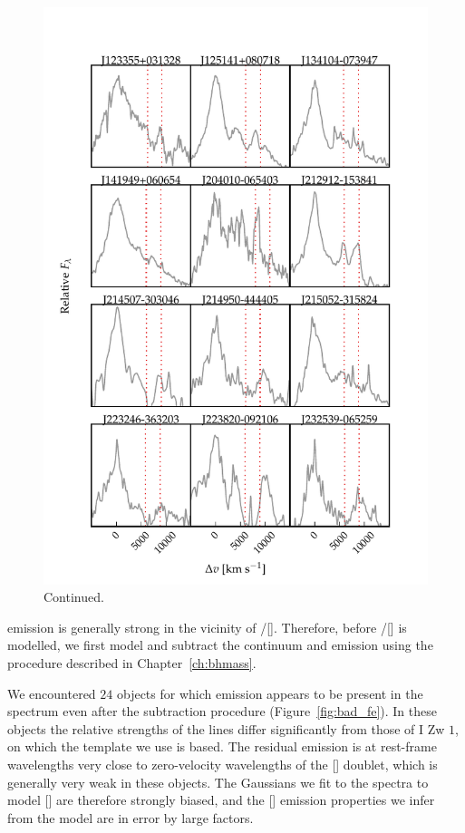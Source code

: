 \begin{figure}
\ContinuedFloat
    \centering
    \includegraphics[width=\columnwidth]{figures/chapter04/example_spectrum_grid_extreme_fe_2.pdf} 
    \caption[]{Continued.}     
\end{figure}


 emission is generally strong in the vicinity of \hbns/[]. 
Therefore, before \hbns/[] is modelled, we first model and subtract the continuum and  emission using the procedure described in Chapter~\ref{ch:bhmass}. 

We encountered $24$ objects for which  emission appears to be present in the spectrum even after the subtraction procedure (Figure~\ref{fig:bad_fe}).  
In these objects the relative strengths of the  lines differ significantly from those of I Zw $1$, on which the \citet{boroson92}  template we use is based. 
The residual  emission is at rest-frame wavelengths very close to zero-velocity wavelengths of the [] doublet, which is generally very weak in these objects. 
The Gaussians we fit to the spectra to model [] are therefore strongly biased, and the [] emission properties we infer from the model are in error by large factors. 


